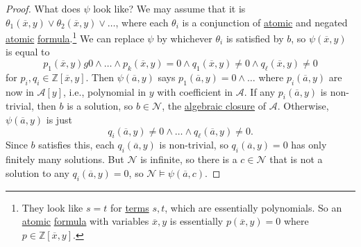 \begin{proof}
	What does \(\psi \) look like? We may assume that it is \(\theta _1(\overline{x} , y) \lor \theta _2(\overline{x} , y) \lor \ldots \), where each \(\theta _i\) is a conjunction of \hyperref[not:atomic]{atomic} and negated \hyperref[not:atomic]{atomic} \hyperref[def:formula]{formula}.\footnote{They look like \(s = t\) for \hyperref[def:term]{terms} \(s, t\), which are essentially polynomials. So an \hyperref[not:atomic]{atomic} \hyperref[def:formula]{formula} with variables \(\overline{x} , y\) is essentially \(p(\overline{x} , y) = 0\) where \(p\in \mathbb{Z} [\overline{x} , y]\).} We can replace \(\psi \) by whichever \(\theta _i\) is satisfied by \(b\), so \(\psi (\overline{x} , y)\) is equal to
	\[
		p_1(\overline{x} , y) g 0 \land \ldots \land p_k(\overline{x} , y) = 0 \land q_1(\overline{x} , y) \neq 0 \land q_{\ell } (\overline{x} , y) \neq 0
	\]
	for \(p_i, q_i\in \mathbb{Z} [\overline{x} , y]\). Then \(\psi (\overline{a} , y)\) says \(p_1(\overline{a} , y) = 0 \land \ldots\) where \(p_i(\overline{a} , y)\) are now in \(\mathcal{A} [y]\), i.e., polynomial in \(y\) with coefficient in \(\mathcal{A} \). If any \(p_i(\overline{a} , y)\) is non-trivial, then \(b\) is a solution, so \(b\in \mathcal{N} \), the \hyperref[def:algebraic-closure]{algebraic closure} of \(\mathcal{A}\). Otherwise, \(\psi (\overline{a} ,y)\) is just
	\[
		q_i(\overline{a} , y) \neq 0 \land \ldots \land q_{\ell } (\overline{a} , y) \neq 0.
	\]
	Since \(b\) satisfies this, each \(q_i(\overline{a} , y)\) is non-trivial, so \(q_i(\overline{a} , y) = 0\) has only finitely many solutions. But \(\mathcal{N} \) is infinite, so there is a \(c\in \mathcal{N} \) that is not a solution to any \(q_i(\overline{a} , y) = 0\), so \(\mathcal{N} \models \psi (\overline{a} , c)\).
\end{proof}